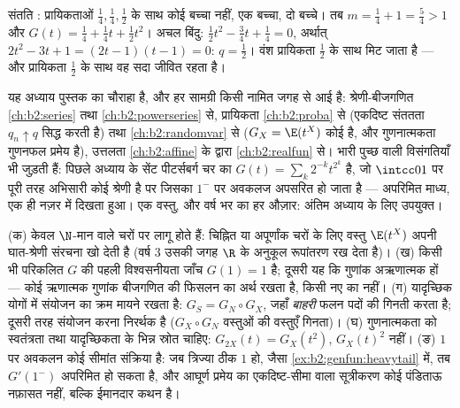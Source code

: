 \begin{example}\label{ex:b2:genfun:branchingexample}
संतति : प्रायिकताओं $\frac14, \frac14, \frac12$ के साथ कोई बच्चा नहीं, एक बच्चा, दो
बच्चे। तब $m = \frac14 + 1 =
\frac54 > 1$ और $G(t) = \frac14 + \frac14 t + \frac12 t^2$। अचल बिंदु: $\frac12 t^2 - \frac34 t + \frac14 = 0$, अर्थात् $2t^2 - 3t
+ 1 = (2t - 1)(t - 1) = 0$: $q = \frac12$। वंश
प्रायिकता $\frac12$ के साथ मिट जाता है --- और प्रायिकता $\frac12$ के साथ वह
सदा जीवित रहता है।
\end{example}

\begin{remark}[इस खंड के भीतर के परिप्रेक्ष्य]
यह अध्याय पुस्तक का चौराहा है, और हर सामग्री किसी नामित जगह से आई
है: श्रेणी-बीजगणित \cref{ch:b2:series} तथा \cref{ch:b2:powerseries} से, प्रायिकता \cref{ch:b2:proba} से (एकदिष्ट
संततता $q_n \uparrow q$ सिद्ध करती है) तथा \cref{ch:b2:randomvar} से ($G_X =
\E(t^X)$ कोई  है, और
गुणनात्मकता गुणनफल प्रमेय है), उत्तलता \cref{ch:b2:affine} के द्वारा \cref{ch:b2:realfun} से। भारी
पुच्छ वाली विसंगतियाँ भी जुड़ती हैं: पिछले अध्याय के सेंट
पीटर्सबर्ग चर का $G(t) = \sum_k2^{-k}t^{2^k}$ है, जो $\intcc01$ पर पूरी तरह अभिसारी कोई श्रेणी है
पर जिसका $1^-$ पर अवकलज अपसरित हो जाता है --- अपरिमित माध्य, एक ही
नज़र में दिखता हुआ। एक वस्तु, और वर्ष भर का हर औज़ार: अंतिम अध्याय
के लिए उपयुक्त।
\end{remark}

\begin{remark}[सामान्य चूकें]
(क)  केवल $\N$-मान वाले चरों पर लागू होते हैं: चिह्नित या
अपूर्णांक चरों के लिए वस्तु $\E(t^X)$ अपनी घात-श्रेणी संरचना खो देती है
(वर्ष 3 उसकी जगह $\R$ के अनुकूल रूपांतरण रख देता है)। (ख) किसी भी
परिकलित $G$ की पहली विश्वसनीयता जाँच $G(1) = 1$ है; दूसरी यह कि गुणांक
अऋणात्मक हों --- कोई ऋणात्मक गुणांक बीजगणित की फिसलन का अर्थ रखता
है, किसी नए  का नहीं। (ग) यादृच्छिक योगों में संयोजन का क्रम
मायने रखता है: $G_S = G_N \circ G_X$, जहाँ \emph{बाहरी} फलन पदों की गिनती करता है;
दूसरी तरह संयोजन करना निरर्थक है ($G_X \circ G_N$ वस्तुओं की वस्तुएँ गिनता)।
(घ) गुणनात्मकता को स्वतंत्रता तथा यादृच्छिकता के भिन्न स्रोत चाहिए:
$G_{2X}(t) = G_X(t^2)$, $G_X(t)^2$ नहीं। (ङ) $1$ पर अवकलन कोई सीमांत संक्रिया है: जब
त्रिज्या ठीक $1$ हो, जैसा \cref{ex:b2:genfun:heavytail} में, तब $G'(1^-)$ अपरिमित हो सकता है,
और आघूर्ण प्रमेय का एकदिष्ट-सीमा वाला सूत्रीकरण कोई पंडिताऊ नफ़ासत
नहीं, बल्कि ईमानदार कथन है।
\end{remark}

